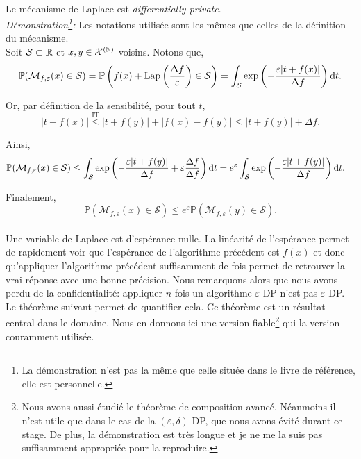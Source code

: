 \theoreme{}\\
Le mécanisme de {\sc Laplace} est \textit{differentially private}.\\


\textit{Démonstration\footnote{La démonstration n'est pas la même que celle située dans le livre de référence, elle est personnelle.}:} Les notations utilisée sont les mêmes que celles de la définition du mécanisme.\\
Soit \(\mathcal S \subset \mathbb{R}\) et \(x,y \in \mathcal X^{(\mathbb{N})}\) voisins. Notons que,
\begin{align*}
    \mathbb P(\mathcal M_{f,\varepsilon}(x) \in \mathcal S) = \mathbb P\left( f(x) + \text{Lap}\left( \dfrac{\Delta f}{\varepsilon} \right) \in \mathcal S\right) = \int_\mathcal S \exp\left( -\dfrac{\varepsilon |t + f(x)|}{\Delta f} \right) \mathrm{d} t.
\end{align*}

Or, par définition de la sensibilité, pour tout \(t\),
\[
    |t + f(x)| \overset{\text{IT}}{\leq} |t + f(y)| + |f(x) - f(y)| \leq |t + f(y)| + \Delta f.
\]

Ainsi,
\begin{align*}
    \mathbb P(\mathcal M_{f,\varepsilon}(x) \in \mathcal S) & \leq \int_\mathcal S \exp\left( -\dfrac{\varepsilon |t + f(y)|}{\Delta f} + \varepsilon \dfrac{\Delta f}{\Delta f}   \right) \mathrm{d} t = e^\varepsilon\int_\mathcal S \exp\left( -\dfrac{\varepsilon |t + f(y)|}{\Delta f} \right) \mathrm{d} t.
\end{align*}

Finalement,
\[ \mathbb P(\mathcal M_{f,\varepsilon}(x) \in \mathcal S) \leq e^{\varepsilon} \mathbb P(\mathcal M_{f,\varepsilon}(y) \in \mathcal S).\]\\


Une variable de {\sc Laplace} est d’espérance nulle. La linéarité de l'espérance permet de rapidement voir que l'espérance de l’algorithme précédent est \(f(x)\) et donc qu'appliquer l'algorithme précédent suffisamment de fois permet de retrouver la vrai réponse avec une bonne précision. Nous remarquons alors que nous avons perdu de la confidentialité: appliquer \(n\) fois un algorithme \(\varepsilon\)-DP n'est pas \(\varepsilon\)-DP. Le théorème suivant permet de quantifier cela. Ce théorème est un résultat central dans le domaine. Nous en donnons ici une version fiable\footnote{Nous avons aussi étudié le théorème de composition avancé. Néanmoins il n'est utile que dans le cas de la \((\varepsilon, \delta)\)-DP, que nous avons évité durant ce stage. De plus, la démonstration est très longue et je ne me la suis pas suffisamment appropriée pour la reproduire.} qui la version couramment utilisée.\\

